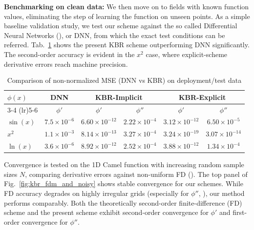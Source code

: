 \documentclass{article} %
\theoremstyle{plain}
\begin{document}
\textbf{Benchmarking on clean data:} We then move on to fields with known function values, eliminating the step of learning the function on unseen points. As a simple baseline validation study, we test our scheme against the so called Differential Neural Networks (\cite{Ledesma2020DifferentialNeuralNetworks}), or DNN, from which the exact test conditions can be referred. Tab.~\ref{tab:DNNvsKBR} shows the present KBR scheme outperforming DNN significantly. The second-order accuracy is evident in the $  x^2  $ case, where explicit-scheme derivative errors reach machine precision.

\begin{table}[h]
    \centering
    \footnotesize
    \caption{Comparison of non-normalized MSE (DNN vs KBR) on deployment/test data}
    \begin{tabular}{@{} l c c c c c @{}}
        \toprule
        $\phi(x)$ & DNN & \multicolumn{2}{c}{KBR-Implicit} & \multicolumn{2}{c}{KBR-Explicit} \\
        \cmidrule(lr){3-4} \cmidrule(lr){5-6}
                  & $\phi'$ & $\phi'$ & $\phi''$ & $\phi'$ & $\phi''$ \\
        \midrule
        $\sin(x)$  & $7.5 \times 10^{-6}$ & $6.60 \times 10^{-12}$ & $2.22 \times 10^{-4}$ & $3.12 \times 10^{-12}$ & $6.50 \times 10^{-5}$ \\
        $x^2$      & $1.1 \times 10^{-3}$ & $8.14 \times 10^{-13}$ & $3.27 \times 10^{-4}$ & $3.24 \times 10^{-19}$ & $3.07 \times 10^{-14}$ \\
        $\ln(x)$   & $3.6 \times 10^{-6}$ & $8.92 \times 10^{-12}$ & $2.52 \times 10^{-4}$ & $3.88 \times 10^{-12}$ & $1.34 \times 10^{-4}$ \\
        \bottomrule
    \end{tabular}
    \label{tab:DNNvsKBR}
\end{table}

Convergence is tested on the 1D Camel function with increasing random sample sizes $  N  $, comparing derivative errors against non-uniform FD (\cite{Fornberg1988,LeVeque2007}). The top panel of Fig.~\ref{fig:kbr_fdm_and_noisy} shows stable convergence for our schemes. While FD accuracy degrades on highly irregular grids (especially for $  \phi''  $, \cite{crowder1971errors,dehoog1985rate}), our method performs comparably. Both the theoretically second-order finite-difference (FD) scheme and the present scheme exhibit second-order convergence for $\phi'$ and first-order convergence for $\phi''$.
\end{document}

